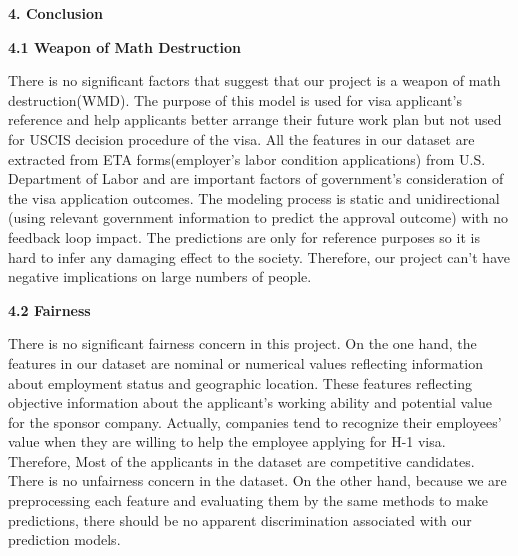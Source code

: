 \documentclass[12pt]{article}
\begin{document}
{\fontsize{14pt}{16.8pt}\selectfont \textbf{4. Conclusion}\par}\par


\vspace{\baselineskip}
\begin{justify}
\textbf{4.1 Weapon of Math Destruction}
\end{justify}\par

\begin{justify}
There is no significant factors that suggest that our project is a weapon of math destruction(WMD). The purpose of this model is used for visa applicant’s reference and help applicants better arrange their future work plan but not used for USCIS decision procedure of the visa. All the features in our dataset are extracted from ETA forms(employer’s labor condition applications) from U.S. Department of Labor and are important factors of government’s consideration of the visa application outcomes. The modeling process is static and unidirectional (using relevant government information to predict the approval outcome) with no feedback loop impact. The predictions are only for reference purposes so it is hard to infer any damaging effect to the society. Therefore, our project can’t have negative implications on large numbers of people. 
\end{justify}\par


\vspace{\baselineskip}
\begin{justify}
\textbf{4.2 Fairness}
\end{justify}\par

\begin{justify}
There is no significant fairness concern in this project. On the one hand, the features in our dataset are nominal or numerical values reflecting information about employment status and geographic location. These features reflecting objective information about the applicant’s working ability and potential value for the sponsor company. Actually, companies tend to recognize their employees’ value when they are willing to help the employee applying for H-1 visa. Therefore, Most of the applicants in the dataset are competitive candidates. There is no unfairness concern in the dataset. On the other hand, because we are preprocessing each feature and evaluating them by the same methods to make predictions, there should be no apparent discrimination associated with our prediction models.
\end{justify}\par
\end{document}
